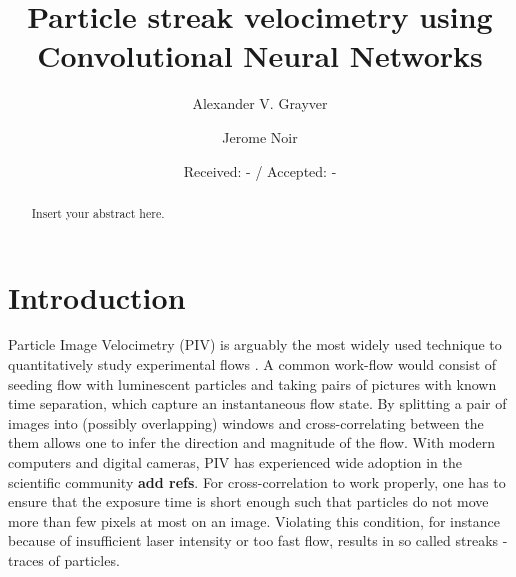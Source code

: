 \documentclass{svjour3}                     %
\begin{document}
\title{Particle streak velocimetry using Convolutional Neural Networks}

\author{Alexander V. Grayver         \and
        Jerome Noir
}


\date{Received: - / Accepted: -}


\maketitle

\begin{abstract}
Insert your abstract here. 
\end{abstract}

\section{Introduction}
\label{sec:intro}

Particle Image Velocimetry (PIV) is arguably the most widely used technique to quantitatively study experimental flows \cite{raffel2018particle}. A common work-flow would consist of seeding flow with luminescent particles and taking pairs of pictures with known time separation, which capture an instantaneous flow state. By splitting a pair of images into (possibly overlapping) windows and cross-correlating between the them allows one to infer the direction and magnitude of the flow. With modern computers and digital cameras, PIV has experienced wide adoption in the scientific community \textbf{add refs}. For cross-correlation to work properly, one has to ensure that the exposure time is short enough such that particles do not move more than few pixels at most on an image. Violating this condition, for instance because of insufficient laser intensity or too fast flow, results in so called streaks - traces of particles.
\end{document}
